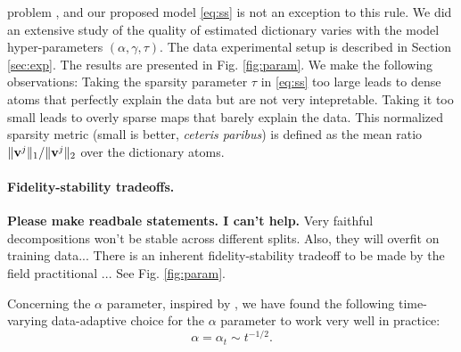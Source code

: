 problem  \cite{mairal2010,jenatton2010structured}, and our proposed model \eqref{eq:ss} is not an exception to this rule. We did an extensive study of the quality of estimated dictionary varies with the model hyper-parameters $(\alpha,\gamma,\tau)$. The data experimental setup is described in Section \ref{sec:exp}.
The results are presented in Fig. \ref{fig:param}.
We make the following observations:
Taking the sparsity parameter $\tau$ in \eqref{eq:ss} too large leads to dense atoms that perfectly explain the data but are not very intepretable. Taking it too small leads to overly sparse maps that barely explain the data. This normalized sparsity metric (small is better, \textit{ceteris paribus}) is defined as the mean ratio $\|\mathbf{v}^j\|_1 / \|\mathbf{v}^j\|_2$ over the dictionary atoms. %

\paragraph*{Fidelity-stability tradeoffs.}
\textbf{Please make readbale statements. I can't help.}
Very faithful decompositions won't be stable across different splits. Also,
they will overfit on training data... There is an inherent fidelity-stability tradeoff to be made by the field practitional  \cite{abraham2013}
... See Fig. \ref{fig:param}.

Concerning the $\alpha$ parameter, inspired by  \cite{ying2006online}, we have found the following time-varying data-adaptive choice for the $\alpha$ parameter to work very well in practice:
\begin{equation}
  \alpha = \alpha_t \sim t^{-1/2}.
  \label{eq:varyingalpha}
\end{equation}

